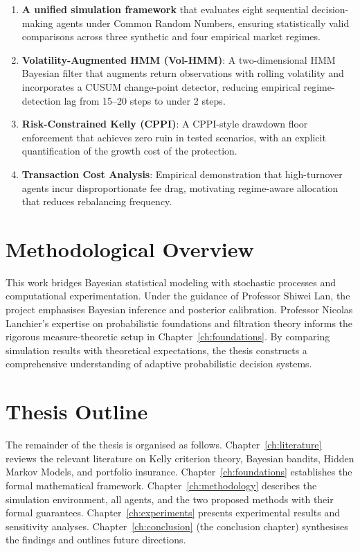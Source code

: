\begin{enumerate}
    \item \textbf{A unified simulation framework} that evaluates eight
    sequential decision-making agents under Common Random Numbers, ensuring
    statistically valid comparisons across three synthetic and four
    empirical market regimes.

    \item \textbf{Volatility-Augmented HMM (Vol-HMM)}: A two-dimensional
    HMM Bayesian filter that augments return observations with rolling
    volatility and incorporates a CUSUM change-point detector, reducing
    empirical regime-detection lag from 15--20 steps to under 2 steps.

    \item \textbf{Risk-Constrained Kelly (CPPI)}: A CPPI-style drawdown
    floor enforcement that achieves zero ruin in tested scenarios, with
    an explicit quantification of the growth cost of the protection.

    \item \textbf{Transaction Cost Analysis}: Empirical demonstration that
    high-turnover agents incur disproportionate fee drag, motivating
    regime-aware allocation that reduces rebalancing frequency.
\end{enumerate}

\section{Methodological Overview}

This work bridges Bayesian statistical modeling with stochastic processes and
computational experimentation. Under the guidance of Professor Shiwei Lan,
the project emphasises Bayesian inference and posterior calibration. Professor
Nicolas Lanchier's expertise on probabilistic foundations and filtration
theory informs the rigorous measure-theoretic setup in
Chapter~\ref{ch:foundations}. By comparing simulation results with
theoretical expectations, the thesis constructs a comprehensive understanding
of adaptive probabilistic decision systems.

\section{Thesis Outline}

The remainder of the thesis is organised as follows.
Chapter~\ref{ch:literature} reviews the relevant literature on Kelly
criterion theory, Bayesian bandits, Hidden Markov Models, and portfolio
insurance. Chapter~\ref{ch:foundations} establishes the formal mathematical
framework. Chapter~\ref{ch:methodology} describes the simulation environment,
all agents, and the two proposed methods with their formal guarantees.
Chapter~\ref{ch:experiments} presents experimental results and sensitivity
analyses. Chapter~\ref{ch:conclusion} (the conclusion chapter) synthesises
the findings and outlines future directions.

